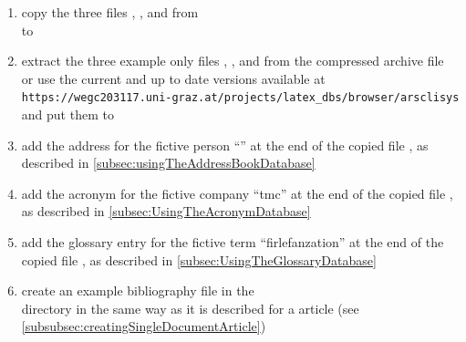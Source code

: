 \begin{enumerate}
\item copy the three files
  , , and  from \\
   to \\

 \item extract the three example only files , , and
   from the compressed archive file \\
  or use the current and up to date versions available at 
  \nolinkurl{https://wegc203117.uni-graz.at/projects/latex_dbs/browser/arsclisys}
  and put them to \\

\item add the address for the fictive person ``'' at the end of
  the copied file , as described in
  \autoref{subsec:usingTheAddressBookDatabase}

\item add the acronym for the fictive company ``\acf{tmc}'' at the end of
  the copied file , as described in
  \autoref{subsec:UsingTheAcronymDatabase}

\item add the glossary entry for the fictive term ``\Gls{firlefanzation}''
  at the end of the copied file , as described in
  \autoref{subsec:UsingTheGlossaryDatabase}

\item create an example bibliography file  in the \\
   directory in the same way as
  it is described for a \singledoc article (see
  \autoref{subsubsec:creatingSingleDocumentArticle})


\end{enumerate}

